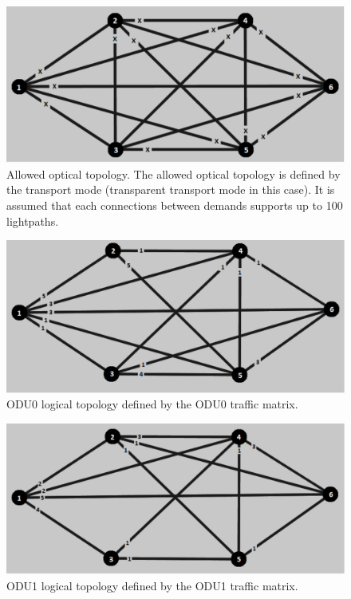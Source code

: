 \begin{figure}[H]
\centering
\includegraphics[width=13cm]{sdf/heuristic/transparent_protection/figures/allowed_optical}
\caption{Allowed optical topology. The allowed optical topology is defined by the transport mode (transparent transport mode in this case). It is assumed that each connections between demands supports up to 100 lightpaths.}
\label{allowed_optical_protection_ref_low_heuristic_transparent}
\end{figure}

\begin{figure}[H]
\centering
\includegraphics[width=13cm]{sdf/heuristic/transparent_protection/figures/logical_topology_odu0_low}
\caption{ODU0 logical topology defined by the ODU0 traffic matrix.}
\label{logical_ODU0_protection_ref_low_heuristic_transparent}
\end{figure}

\begin{figure}[H]
\centering
\includegraphics[width=13cm]{sdf/heuristic/transparent_protection/figures/logical_topology_odu1_low}
\caption{ODU1 logical topology defined by the ODU1 traffic matrix.}
\label{logical_ODU1_protection_ref_low_heuristic_transparent}
\end{figure}

